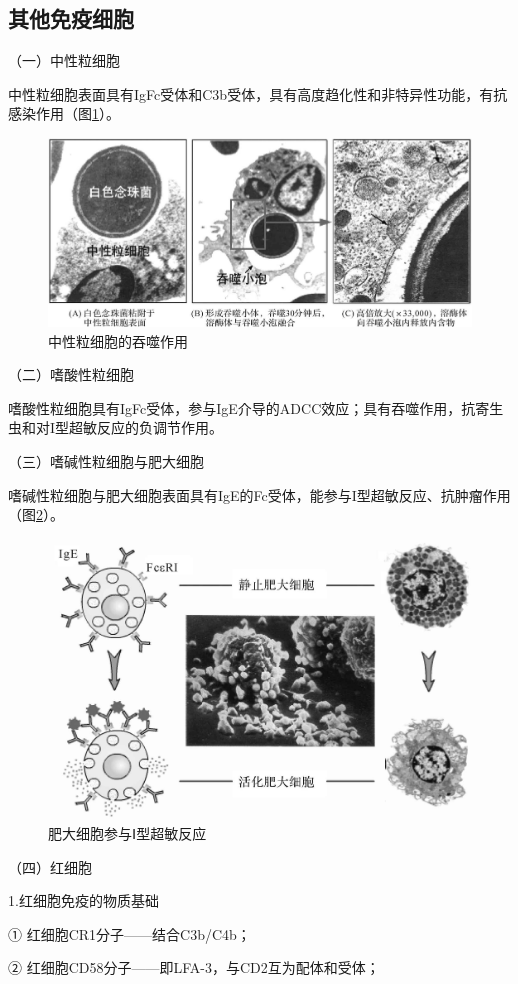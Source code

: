 \subsection{其他免疫细胞}

（一）中性粒细胞

中性粒细胞表面具有IgFc受体和C3b受体，具有高度趋化性和非特异性功能，有抗感染作用（图\ref{fig2-22}）。

\begin{figure}[!htbp]
 \centering
 \includegraphics[width=.7\textwidth]{./images/Image00047.jpg}
 \caption{中性粒细胞的吞噬作用}
 \label{fig2-22}
  \end{figure} 

（二）嗜酸性粒细胞

嗜酸性粒细胞具有IgFc受体，参与IgE介导的ADCC效应；具有吞噬作用，抗寄生虫和对I型超敏反应的负调节作用。

（三）嗜碱性粒细胞与肥大细胞

嗜碱性粒细胞与肥大细胞表面具有IgE的Fc受体，能参与I型超敏反应、抗肿瘤作用（图\ref{fig2-23}）。

\begin{figure}[!htbp]
 \centering
 \includegraphics[width=.6\textwidth]{./images/Image00048.jpg}
 \caption{肥大细胞参与Ⅰ型超敏反应}
 \label{fig2-23}
  \end{figure} 

（四）红细胞

1.红细胞免疫的物质基础

① 红细胞CR1分子------结合C3b/C4b；

② 红细胞CD58分子------即LFA-3，与CD2互为配体和受体；

